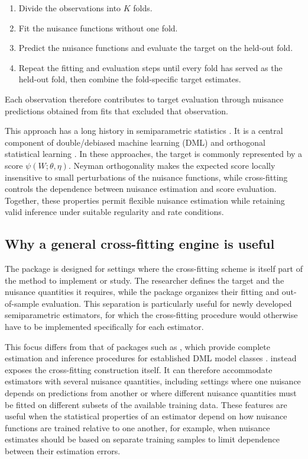 \begin{enumerate}
\def\labelenumi{\arabic{enumi}.}
\tightlist
\item
  Divide the observations into \(K\) folds.
\item
  Fit the nuisance functions without one fold.
\item
  Predict the nuisance functions and evaluate the target on the held-out fold.
\item
  Repeat the fitting and evaluation steps until every fold has served as the held-out fold, then combine the fold-specific target estimates.
\end{enumerate}

Each observation therefore contributes to target evaluation through nuisance predictions obtained from fits that excluded that observation.

This approach has a long history in semiparametric statistics \citep{bickel1982, schick1986, zheng2011, newey2018}. It is a central component of double/debiased machine learning (DML) \citep{chernozhukov2018} and orthogonal statistical learning \citep{foster2023}. In these approaches, the target is commonly represented by a score \(\psi(W; \theta, \eta)\). Neyman orthogonality makes the expected score locally insensitive to small perturbations of the nuisance functions, while cross-fitting controls the dependence between nuisance estimation and score evaluation. Together, these properties permit flexible nuisance estimation while retaining valid inference under suitable regularity and rate conditions.

\subsection{Why a general cross-fitting engine is useful}\label{subsec:need}

The  package is designed for settings where the cross-fitting scheme is itself part of the method to implement or study. The researcher defines the target and the nuisance quantities it requires, while the package organizes their fitting and out-of-sample evaluation. This separation is particularly useful for newly developed semiparametric estimators, for which the cross-fitting procedure would otherwise have to be implemented specifically for each estimator.

This focus differs from that of packages such as , which provide complete estimation and inference procedures for established DML model classes \citep{bach2024}.  instead exposes the cross-fitting construction itself. It can therefore accommodate estimators with several nuisance quantities, including settings where one nuisance depends on predictions from another or where different nuisance quantities must be fitted on different subsets of the available training data. These features are useful when the statistical properties of an estimator depend on how nuisance functions are trained relative to one another, for example, when nuisance estimates should be based on separate training samples to limit dependence between their estimation errors.

